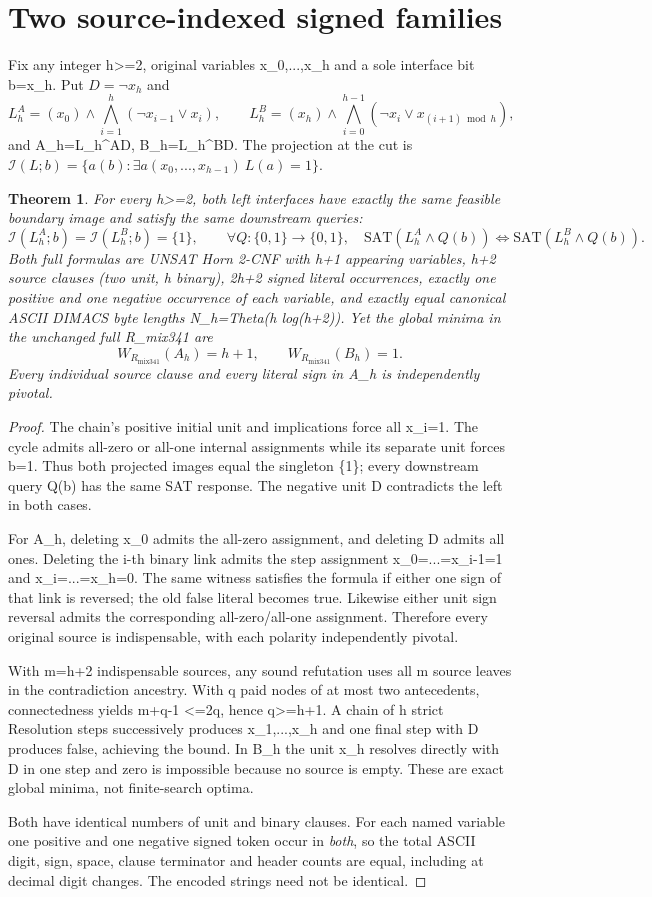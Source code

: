 \documentclass[11pt]{article}
\newtheorem{theorem}{Theorem}
\begin{document}
\section*{Two source-indexed signed families}
Fix any integer h>=2, original variables x\_0,...,x\_h and a sole interface bit b=x\_h. Put \(D=\neg x_h\) and
\[
 L_h^A=(x_0)\land\bigwedge_{i=1}^{h}(\neg x_{i-1}\vee x_i),\qquad
 L_h^B=(x_h)\land\bigwedge_{i=0}^{h-1}(\neg x_i\vee x_{(i+1)\bmod h}),
\]
and A\_h=L\_h^A\land D, B\_h=L\_h^B\land D. The projection at the cut is \(\mathcal I(L;b)=\{a(b):\exists a(x_0,...,x_{h-1})\ L(a)=1\}\).
\begin{theorem}
For every h>=2, both left interfaces have exactly the same feasible boundary image and satisfy the same downstream queries:
\[
 \mathcal I(L_h^A;b)=\mathcal I(L_h^B;b)=\{1\},
 \qquad \forall Q:\{0,1\}\to\{0,1\},\quad
 \mathrm{SAT}(L_h^A\land Q(b))\iff\mathrm{SAT}(L_h^B\land Q(b)).
\]
Both full formulas are UNSAT Horn 2-CNF with h+1 appearing variables, h+2 source clauses (two unit, h binary), 2h+2 signed literal occurrences, exactly one positive and one negative occurrence of \emph{each} variable, and exactly equal canonical ASCII DIMACS byte lengths N\_h=Theta(h log(h+2)). Yet the \emph{global minima in the unchanged full R\_mix341} are
\[
 \boxed{W_{R_{\mathrm{mix341}}}(A_h)=h+1,\qquad W_{R_{\mathrm{mix341}}}(B_h)=1.}
\]
Every individual source clause and every literal sign in A\_h is independently pivotal.
\end{theorem}
\begin{proof}
The chain's positive initial unit and implications force all x\_i=1. The cycle admits all-zero or all-one internal assignments while its separate unit forces b=1. Thus both projected images equal the singleton \{1\}; every downstream query Q(b) has the same SAT response. The negative unit D contradicts the left in both cases.

For A\_h, deleting x\_0 admits the all-zero assignment, and deleting D admits all ones. Deleting the i-th binary link admits the step assignment x\_0=...=x\_{i-1}=1 and x\_i=...=x\_h=0. The same witness satisfies the formula if either one sign of that link is reversed; the old false literal becomes true. Likewise either unit sign reversal admits the corresponding all-zero/all-one assignment. Therefore every original source is indispensable, with each polarity independently pivotal.

With m=h+2 indispensable sources, any sound refutation uses all m source leaves in the contradiction ancestry. With q paid nodes of at most two antecedents, connectedness yields m+q-1 <=2q, hence q>=h+1. A chain of h strict Resolution steps successively produces x\_1,...,x\_h and one final step with D produces false, achieving the bound. In B\_h the unit x\_h resolves directly with D in one step and zero is impossible because no source is empty. These are exact global minima, not finite-search optima.

Both have identical numbers of unit and binary clauses. For each named variable one positive and one negative signed token occur in \emph{both}, so the total ASCII digit, sign, space, clause terminator and header counts are equal, including at decimal digit changes. The encoded strings need not be identical.
\end{proof}
\end{document}
